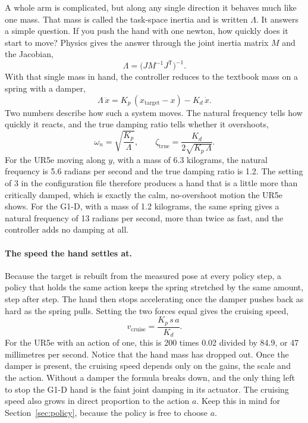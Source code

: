 A whole arm is complicated, but along any single direction it behaves much like one mass. That mass is called the task-space inertia and is written $\Lambda$. It answers a simple question. If you push the hand with one newton, how quickly does it start to move? Physics gives the answer through the joint inertia matrix $M$ and the Jacobian,
\begin{equation}
\Lambda = \big(J M^{-1} J^{\mathsf T}\big)^{-1}.
\end{equation}
With that single mass in hand, the controller reduces to the textbook mass on a spring with a damper,
\begin{equation}
\Lambda\,\ddot x = K_p\,(x_{\text{target}} - x) - K_d\,\dot x .
\end{equation}
Two numbers describe how such a system moves. The natural frequency tells how quickly it reacts, and the true damping ratio tells whether it overshoots,
\begin{equation}
\omega_n = \sqrt{\frac{K_p}{\Lambda}}, \qquad \zeta_{\text{true}} = \frac{K_d}{2\sqrt{K_p\,\Lambda}} .
\end{equation}
For the UR5e moving along $y$, with a mass of 6.3 kilograms, the natural frequency is 5.6 radians per second and the true damping ratio is 1.2. The setting of 3 in the configuration file therefore produces a hand that is a little more than critically damped, which is exactly the calm, no-overshoot motion the UR5e shows. For the G1-D, with a mass of 1.2 kilograms, the same spring gives a natural frequency of 13 radians per second, more than twice as fast, and the controller adds no damping at all.

\paragraph{The speed the hand settles at.} Because the target is rebuilt from the measured pose at every policy step, a policy that holds the same action keeps the spring stretched by the same amount, step after step. The hand then stops accelerating once the damper pushes back as hard as the spring pulls. Setting the two forces equal gives the cruising speed,
\begin{equation}
v_{\text{cruise}} = \frac{K_p\, s\, a}{K_d}.
\label{eq:cruise}
\end{equation}
For the UR5e with an action of one, this is 200 times 0.02 divided by 84.9, or 47 millimetres per second. Notice that the hand mass has dropped out. Once the damper is present, the cruising speed depends only on the gains, the scale and the action. Without a damper the formula breaks down, and the only thing left to stop the G1-D hand is the faint joint damping in its actuator. The cruising speed also grows in direct proportion to the action $a$. Keep this in mind for Section~\ref{sec:policy}, because the policy is free to choose $a$.

